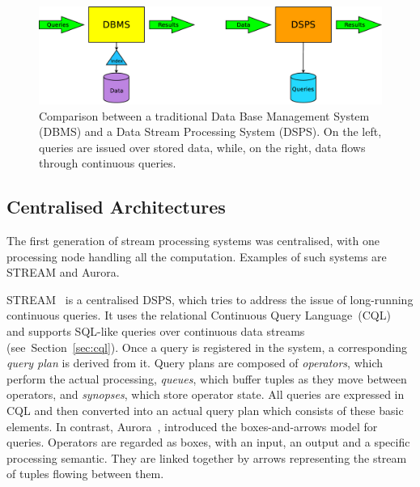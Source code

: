 \begin{figure}[t!] \centering \includegraphics[width=\textwidth]{img/tesi/dbms+dsms} \caption{Comparison
between a traditional Data Base Management System (DBMS) and a Data Stream Processing System (DSPS). On
the left, queries are issued over stored data, while, on the right, data flows through continuous
queries.}
\label{fig:dbms+dsms}
\end{figure}

\subsection*{Centralised Architectures}

The first generation of stream processing systems was centralised, with one processing node handling all
the computation. Examples of such systems are STREAM and Aurora.

STREAM~\cite{stream, stream-babcock, stream-chains} is a centralised DSPS, which tries to address the
issue of long-running continuous queries. It uses the relational Continuous Query
Language~(CQL)~\cite{cql} and supports SQL-like queries over continuous data
streams (see~Section~\ref{sec:cql}).
Once a query is registered in the system, a corresponding \textit{query plan} is derived from it.
Query plans are composed of \textit{operators}, which perform the actual processing, \textit{queues},
which buffer tuples as they move between operators, and \textit{synopses}, which store operator state.
All queries are expressed in CQL and then converted into an actual query plan which consists of these
basic elements.
In contrast, Aurora~\cite{aurora}, introduced the boxes-and-arrows model for queries. Operators are
regarded as boxes, with an input, an output and a specific processing semantic. They are linked
together by arrows representing the stream of tuples flowing between them.
			

